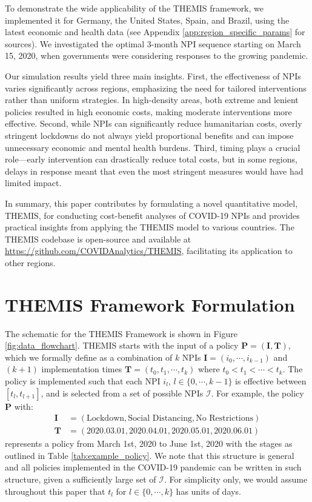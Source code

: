 \documentclass[msom,blindrev]{informs3} %
\begin{document}
To demonstrate the wide applicability of the THEMIS framework, we implemented it for Germany, the United States, Spain, and Brazil, using the latest economic and health data (see Appendix \ref{app:region_specific_params} for sources). We investigated the optimal 3-month NPI sequence starting on March 15, 2020, when governments were considering responses to the growing pandemic.

Our simulation results yield three main insights. First, the effectiveness of NPIs varies significantly across regions, emphasizing the need for tailored interventions rather than uniform strategies. In high-density areas, both extreme and lenient policies resulted in high economic costs, making moderate interventions more effective. Second, while NPIs can significantly reduce humanitarian costs, overly stringent lockdowns do not always yield proportional benefits and can impose unnecessary economic and mental health burdens. Third, timing plays a crucial role—early intervention can drastically reduce total costs, but in some regions, delays in response meant that even the most stringent measures would have had limited impact.

In summary, this paper contributes by formulating a novel quantitative model, THEMIS, for conducting cost-benefit analyses of COVID-19 NPIs and provides practical insights from applying the THEMIS model to various countries. The THEMIS codebase is open-source and available at \url{https://github.com/COVIDAnalytics/THEMIS}, facilitating its application to other regions.


\section{THEMIS Framework Formulation}
\label{sec:model}

The schematic for the THEMIS Framework is shown in Figure \ref{fig:data_flowchart}. THEMIS starts with the input of a policy $\bm{P}= (\bm{I},\bm{T})$, which we formally define as a combination of $k$ NPIs $\bm{I}=(i_0,\cdots,i_{k-1})$ and $(k+1)$ implementation times $\bm{T}=(t_0,t_1,\cdots,t_k)$ where $t_0<t_1<\cdots<t_k$. The policy is implemented such that each NPI $i_l$, $l \in \{0,\cdots,k-1\}$ is effective between $[t_l,t_{l+1}]$, and is selected from a set of possible NPIs $\mathcal{I}$. For example, the policy $\bm{P}$ with:
\begin{align*}
    \bm{I} &= (\text{Lockdown}, \text{Social Distancing}, \text{No Restrictions})\\
    \bm{T} &=(2020.03.01, 2020.04.01, 2020.05.01, 2020.06.01)
\end{align*}
represents a policy from March 1st, 2020 to June 1st, 2020 with the stages as outlined in Table \ref{tab:example_policy}. We note that this structure is general and all policies implemented in the COVID-19 pandemic can be written in such structure, given a sufficiently large set of $\mathcal{I}$. For simplicity only, we would assume throughout this paper that $t_l$ for $l\in \{0,\cdots,k\}$ has units of days. 
\end{document}
